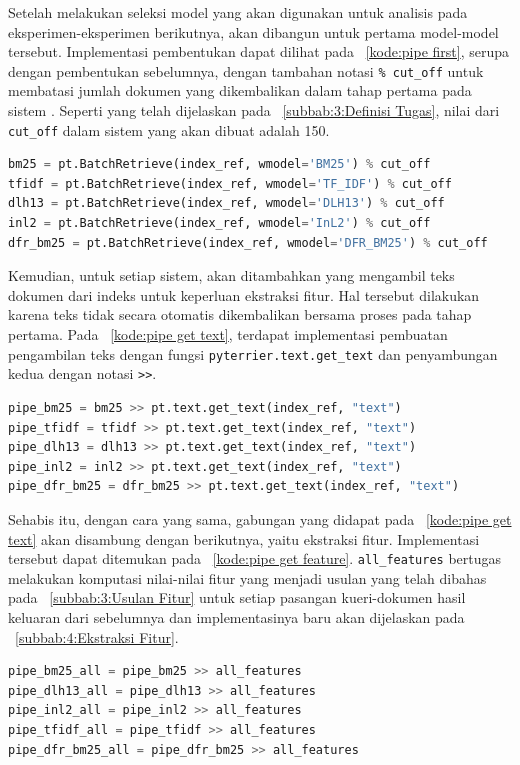 Setelah melakukan seleksi model yang akan digunakan untuk analisis pada eksperimen-eksperimen berikutnya, akan dibangun \pipeline{} untuk \ranking{} pertama model-model tersebut. Implementasi pembentukan \pipeline{} dapat dilihat pada \kode{}~\ref{kode:pipe first}, serupa dengan pembentukan sebelumnya, dengan tambahan notasi \lstinline{% cut_off} untuk membatasi jumlah dokumen yang dikembalikan dalam tahap \ranking{} pertama pada sistem \cascaded{} \ir{}. Seperti yang telah dijelaskan pada \subbab{}~\ref{subbab:3:Definisi Tugas}, nilai dari \lstinline{cut_off} dalam sistem yang akan dibuat adalah 150.
\begin{lstlisting}[language=Python, caption={\Pipeline{} tahap \ranking{} pertama}, label={kode:pipe first}]
bm25 = pt.BatchRetrieve(index_ref, wmodel='BM25') % cut_off
tfidf = pt.BatchRetrieve(index_ref, wmodel='TF_IDF') % cut_off
dlh13 = pt.BatchRetrieve(index_ref, wmodel='DLH13') % cut_off
inl2 = pt.BatchRetrieve(index_ref, wmodel='InL2') % cut_off
dfr_bm25 = pt.BatchRetrieve(index_ref, wmodel='DFR_BM25') % cut_off
\end{lstlisting}

Kemudian, untuk setiap sistem, akan ditambahkan \pipeline{} yang mengambil teks dokumen dari indeks untuk keperluan ekstraksi fitur. Hal tersebut dilakukan karena teks tidak secara otomatis dikembalikan bersama proses \retrieval{} pada \ranking{} tahap pertama. Pada \kode{}~\ref{kode:pipe get text}, terdapat implementasi pembuatan \pipeline{} pengambilan teks dengan fungsi \lstinline{pyterrier.text.get_text} dan penyambungan kedua \pipeline{} dengan notasi \lstinline{>>}.
\begin{lstlisting}[language=Python, caption={Pengambilan teks dokumen pada \pipeline{}}, label={kode:pipe get text}]
pipe_bm25 = bm25 >> pt.text.get_text(index_ref, "text")
pipe_tfidf = tfidf >> pt.text.get_text(index_ref, "text")
pipe_dlh13 = dlh13 >> pt.text.get_text(index_ref, "text")
pipe_inl2 = inl2 >> pt.text.get_text(index_ref, "text")
pipe_dfr_bm25 = dfr_bm25 >> pt.text.get_text(index_ref, "text")
\end{lstlisting}

Sehabis itu, dengan cara yang sama, \pipeline{} gabungan yang didapat pada \kode{}~\ref{kode:pipe get text} akan disambung dengan \pipeline{} berikutnya, yaitu \pipeline{} ekstraksi fitur. Implementasi tersebut dapat ditemukan pada \kode{}~\ref{kode:pipe get feature}. \Pipeline{} \lstinline{all_features} bertugas melakukan komputasi nilai-nilai fitur yang menjadi usulan yang telah dibahas pada \subbab{}~\ref{subbab:3:Usulan Fitur} untuk setiap pasangan kueri-dokumen hasil keluaran dari \pipeline{} sebelumnya dan implementasinya baru akan dijelaskan pada \subbab{}~\ref{subbab:4:Ekstraksi Fitur}.
\begin{lstlisting}[language=Python, caption={\Pipeline{} ekstraksi fitur}, label={kode:pipe get feature}]
pipe_bm25_all = pipe_bm25 >> all_features
pipe_dlh13_all = pipe_dlh13 >> all_features
pipe_inl2_all = pipe_inl2 >> all_features
pipe_tfidf_all = pipe_tfidf >> all_features
pipe_dfr_bm25_all = pipe_dfr_bm25 >> all_features
\end{lstlisting}

